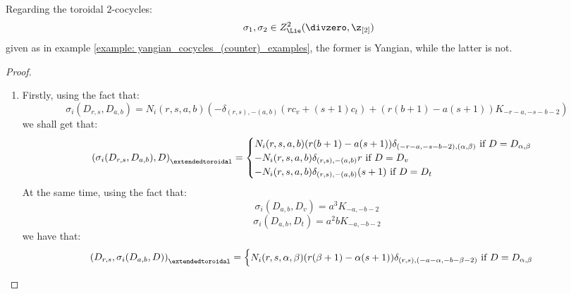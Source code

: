         \begin{proposition} \label{prop: yangianness_of_billig_toroidal_cocycles}
            Regarding the toroidal $2$-cocycles:
                $$\sigma_1, \sigma_2 \in Z^2_{\Lie}(\divzero, \z_{[2]})$$
            given as in example \ref{example: yangian_cocycles_(counter)_examples}, the former is Yangian, while the latter is not.
        \end{proposition}
            \begin{proof}
                \begin{enumerate}
                    \item Firstly, using the fact that:
                        $$\sigma_i(D_{r, s}, D_{a, b}) = N_i(r, s, a, b) \left( -\delta_{(r, s), -(a, b)} (r c_v + (s + 1) c_t) + ( r(b + 1) - a(s + 1) )K_{-r - a, -s - b - 2} \right)$$
                    we shall get that:
                        $$
                            \left( \sigma_i(D_{r, s}, D_{a, b}), D \right)_{\extendedtoroidal} =
                            \begin{cases}
                                \text{$N_i(r, s, a, b) ( r(b + 1) - a(s + 1) ) \delta_{(-r - a, -s - b - 2), (\alpha, \beta)}$ if $D = D_{\alpha, \beta}$}
                                \\
                                \text{$-N_i(r, s, a, b) \delta_{(r, s), -(a, b)} r$ if $D = D_v$}
                                \\
                                \text{$-N_i(r, s, a, b) \delta_{(r, s), -(a, b)} (s + 1)$ if $D = D_t$}
                            \end{cases}
                        $$
                    At the same time, using the fact that:
                        $$\sigma_i(D_{a, b}, D_v) = a^3 K_{-a, -b - 2}$$
                        $$\sigma_i(D_{a, b}, D_t) = a^2b K_{-a, -b - 2}$$
                    we have that:
                        $$
                            \begin{aligned}
                                \left( D_{r, s}, \sigma_i(D_{a, b}, D) \right)_{\extendedtoroidal} =
                                \begin{cases}
                                    \text{$N_i(r, s, \alpha, \beta) ( r(\beta + 1) - \alpha(s + 1) ) \delta_{(r, s), (-a - \alpha, -b - \beta - 2)}$ if $D = D_{\alpha, \beta}$}
                                    \\

\end{cases}
\end{aligned}$$
\end{enumerate}
\end{proof}
